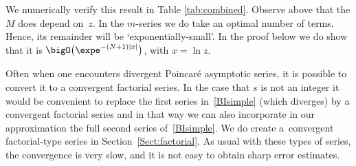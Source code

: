  We numerically verify this result in Table \ref{tab:combined}.
Observe above that the $M$ does depend on~$z$. In the $m$-series we do take an optimal
number of terms. Hence, its remainder will be `exponentially-small'.
In the proof below we do show that it is $\bigO\bigl(\expe^{-(N+1)|x|}\bigr)$,
with $x=\ln z$.

Often when one encounters divergent Poincar\'e asymptotic series, it is possible to convert it
to a convergent factorial series. In the case that $s$ is not an integer it would be convenient
to replace the first series in~\eqref{BIsimple} (which diverges) by a convergent factorial
series and in that way we can also incorporate in our approximation the full second series
of~\eqref{BIsimple}. We do create a~convergent factorial-type series in
Section~\ref{Sect:factorial}. As usual with these types of series, the convergence is very slow, and
it is not easy to obtain sharp error estimates.

